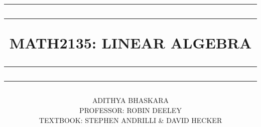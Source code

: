 \title{

    \rule{15cm}{1.6pt}\vspace*{-\baselineskip}\vspace*{2pt}
    \rule{15cm}{0.4pt}
	
	\vspace{0.75\baselineskip}
		
	\Huge{MATH2135: LINEAR ALGEBRA\\\vspace{3mm}}

	\rule{15cm}{0.4pt}\vspace*{-\baselineskip}\vspace{3.2pt}
	\rule{15cm}{1.6pt}

}

\author{ADITHYA BHASKARA\\\vspace{0.4cm}\small{PROFESSOR: ROBIN DEELEY}\\\vspace{1em}\small{TEXTBOOK: STEPHEN ANDRILLI \& DAVID HECKER}}

\date{}